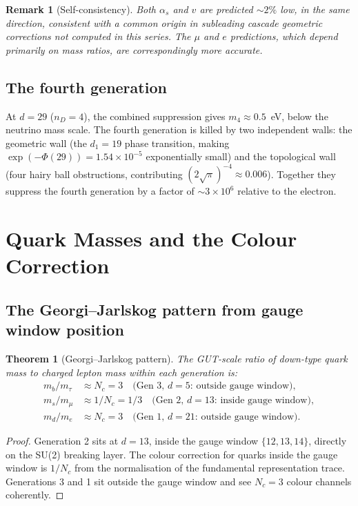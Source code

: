 \documentclass[12pt,a4paper]{article}
\newtheorem{theorem}{Theorem}[section]
\newtheorem*{remark}{Remark}
\begin{document}
\begin{remark}[Self-consistency]
Both $\alpha_s$ and $v$ are predicted $\sim 2\%$ low, in the same direction, consistent with a common origin in subleading cascade geometric corrections not computed in this series. The $\mu$ and $e$ predictions, which depend primarily on mass ratios, are correspondingly more accurate.
\end{remark}

\subsection{The fourth generation}

At $d = 29$ ($n_D = 4$), the combined suppression gives $m_4 \approx 0.5$~eV, below the neutrino mass scale. The fourth generation is killed by two independent walls: the geometric wall (the $d_1 = 19$ phase transition, making $\exp(-\Phi(29)) = 1.54 \times 10^{-5}$ exponentially small) and the topological wall (four hairy ball obstructions, contributing $(2\sqrt{\pi})^{-4} \approx 0.006$). Together they suppress the fourth generation by a factor of $\sim 3 \times 10^6$ relative to the electron.

\section{Quark Masses and the Colour Correction}

\subsection{The Georgi--Jarlskog pattern from gauge window position}

\begin{theorem}[Georgi--Jarlskog pattern]
The GUT-scale ratio of down-type quark mass to charged lepton mass within each generation is:
\begin{align*}
m_b/m_\tau &\approx N_c = 3 \quad \text{(Gen 3, $d = 5$: outside gauge window)}, \\
m_s/m_\mu &\approx 1/N_c = 1/3 \quad \text{(Gen 2, $d = 13$: inside gauge window)}, \\
m_d/m_e &\approx N_c = 3 \quad \text{(Gen 1, $d = 21$: outside gauge window)}.
\end{align*}
\end{theorem}

\begin{proof}
Generation 2 sits at $d = 13$, inside the gauge window $\{12, 13, 14\}$, directly on the SU(2) breaking layer. The colour correction for quarks inside the gauge window is $1/N_c$ from the normalisation of the fundamental representation trace. Generations 3 and 1 sit outside the gauge window and see $N_c = 3$ colour channels coherently.
\end{proof}
\end{document}

